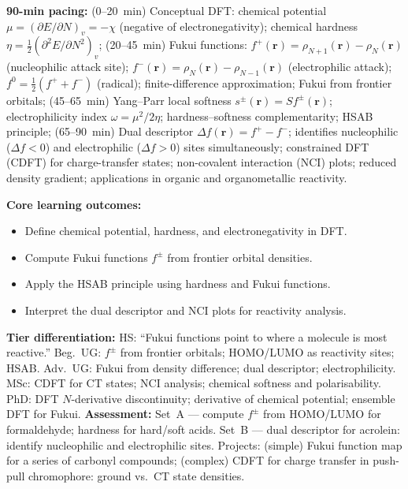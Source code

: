 \documentclass[11pt,a4paper]{article}
\begin{document}
\medskip

\begin{tcolorbox}[chembox, title={Module~III.3 --- Lecture L05: Useful DFT Quantities --- Fukui Functions and Reactivity Indices}]
\textbf{90-min pacing:} (0--20~min) Conceptual DFT: chemical potential $\mu=(\partial E/\partial N)_v=-\chi$ (negative of electronegativity); chemical hardness $\eta=\tfrac{1}{2}(\partial^2 E/\partial N^2)_v$; (20--45~min) Fukui functions: $f^+(\mathbf{r})=\rho_{N+1}(\mathbf{r})-\rho_N(\mathbf{r})$ (nucleophilic attack site); $f^-(\mathbf{r})=\rho_N(\mathbf{r})-\rho_{N-1}(\mathbf{r})$ (electrophilic attack); $f^0=\tfrac{1}{2}(f^++f^-)$ (radical); finite-difference approximation; Fukui from frontier orbitals; (45--65~min) Yang--Parr local softness $s^\pm(\mathbf{r})=Sf^\pm(\mathbf{r})$; electrophilicity index $\omega=\mu^2/2\eta$; hardness--softness complementarity; HSAB principle; (65--90~min) Dual descriptor $\Delta f(\mathbf{r})=f^+-f^-$; identifies nucleophilic ($\Delta f<0$) and electrophilic ($\Delta f>0$) sites simultaneously; constrained DFT (CDFT) for charge-transfer states; non-covalent interaction (NCI) plots; reduced density gradient; applications in organic and organometallic reactivity.

\medskip\textbf{Core learning outcomes:}
\begin{itemize}[leftmargin=1.4em,topsep=2pt,itemsep=1pt]
  \item Define chemical potential, hardness, and electronegativity in DFT.
  \item Compute Fukui functions $f^\pm$ from frontier orbital densities.
  \item Apply the HSAB principle using hardness and Fukui functions.
  \item Interpret the dual descriptor and NCI plots for reactivity analysis.
\end{itemize}
\medskip\textbf{Tier differentiation:}
HS: ``Fukui functions point to where a molecule is most reactive.''
Beg.\ UG: $f^\pm$ from frontier orbitals; HOMO/LUMO as reactivity sites; HSAB.
Adv.\ UG: Fukui from density difference; dual descriptor; electrophilicity.
MSc: CDFT for CT states; NCI analysis; chemical softness and polarisability.
PhD: DFT $N$-derivative discontinuity; derivative of chemical potential; ensemble DFT for Fukui.
\medskip\textbf{Assessment:}
Set~A --- compute $f^\pm$ from HOMO/LUMO for formaldehyde; hardness for hard/soft acids.
Set~B --- dual descriptor for acrolein: identify nucleophilic and electrophilic sites.
Projects: (simple) Fukui function map for a series of carbonyl compounds; (complex) CDFT for charge transfer in push-pull chromophore: ground vs.\ CT state densities.
\end{tcolorbox}
\end{document}
